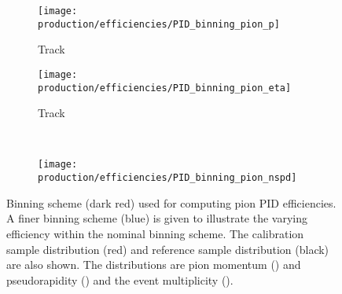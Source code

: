 \begin{figure}
  \begin{subfigure}[b]{0.5\textwidth}
    \centering
    \texttt{[image: production/efficiencies/PID\_binning\_pion\_p]}
    \caption{Track \ptot}
    \label{fig:prod:effs:pid:binning:pion:p}
  \end{subfigure}
  \begin{subfigure}[b]{0.5\textwidth}
    \centering
    \texttt{[image: production/efficiencies/PID\_binning\_pion\_eta]}
    \caption{Track \Eta}
    \label{fig:prod:effs:pid:binning:pion:eta}
  \end{subfigure}
  \\[0.5cm]
  \begin{subfigure}[b]{0.5\textwidth}
    \centering
    \texttt{[image: production/efficiencies/PID\_binning\_pion\_nspd]}
    \caption{\nspd}
    \label{fig:prod:effs:pid:binning:pion:nspd}
  \end{subfigure}
  \caption{%
    Binning scheme (dark red) used for computing pion \ac{PID} efficiencies.
    A finer binning scheme (blue) is given to illustrate the varying efficiency
    within the nominal binning scheme.
    The calibration sample distribution (red) and reference sample distribution
    (black) are also shown.
    The distributions are pion momentum
    () and pseudorapidity
    () and the event multiplicity
    ().
  }
  \label{fig:prod:pid:binning:pion}
\end{figure}
